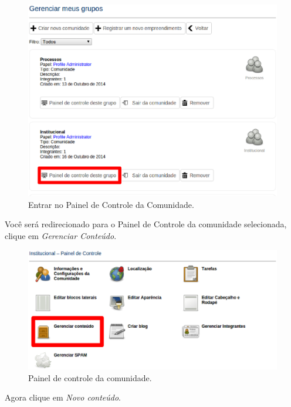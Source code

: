 \begin{figure}[H]
  \centering
    \includegraphics[keepaspectratio=true,scale=0.49]{figuras/selecionandoComunidade.eps}
  \caption{Entrar no Painel de Controle da Comunidade.}
  \label{fig:selecionandoComunidade}
\end{figure}

\newpage
Você será redirecionado para o Painel de Controle da comunidade selecionada, clique em \emph{Gerenciar Conteúdo}.

\begin{figure}[H]
  \centering
    \includegraphics[keepaspectratio=true,scale=0.49]{figuras/painelControleGerenciarConteudo.eps}
  \caption{Painel de controle da comunidade.}
  \label{fig:GerContPainelControle}
\end{figure}

Agora clique em \emph{Novo conteúdo}.

